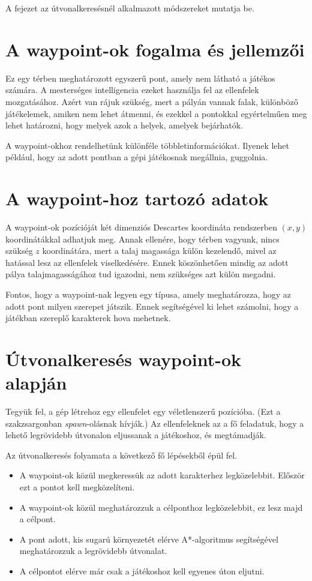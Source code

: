 \label{Chap:utvonalkereses}

A fejezet az útvonalkeresésnél alkalmazott módszereket mutatja be.

\section{A waypoint-ok fogalma és jellemzői}

Ez egy térben meghatározott egyszerű pont, amely nem látható a játékos számára. A mesterséges intelligencia ezeket használja fel az ellenfelek mozgatásához. Azért van rájuk szükség, mert a pályán vannak falak, különböző játékelemek, amiken nem lehet átmenni, és ezekkel a pontokkal egyértelműen meg lehet határozni, hogy melyek azok a helyek, amelyek bejárhatók.

A waypoint-okhoz rendelhetünk különféle többletinformációkat. Ilyenek lehet például, hogy az adott pontban a gépi játékosnak megállnia, guggolnia.

\section{A waypoint-hoz tartozó adatok}

A waypoint-ok pozícióját két dimenziós Descartes koordináta rendszerben $(x, y)$ koordinátákkal adhatjuk meg. Annak ellenére, hogy térben vagyunk, nincs szükség $z$ koordinátára, mert a talaj magassága külön kezelendő, mivel az hatással lesz az ellenfelek viselkedésére. Ennek köszönhetően mindig az adott pálya talajmagasságához tud igazodni, nem szükséges azt külön megadni.

Fontos, hogy a waypoint-nak legyen egy típusa, amely meghatározza, hogy az adott pont milyen szerepet játszik. Ennek segítségével ki lehet számolni, hogy a játékban szereplő karakterek hova mehetnek.

\section{Útvonalkeresés waypoint-ok alapján}

Tegyük fel, a gép létrehoz egy ellenfelet egy véletlenszerű pozícióba. (Ezt a szakzsargonban \textit{spawn}-olásnak hívják.) Az ellenfeleknek az a fő feladatuk, hogy a lehető legrövidebb útvonalon eljussanak a játékoshoz, és megtámadják. 

Az útvonalkeresés folyamata a következő fő lépésekből épül fel.
\begin{itemize}
\item A waypoint-ok közül megkeressük az adott karakterhez legközelebbit. Először ezt a pontot kell megközelíteni.
\item A waypoint-ok közül meghatározzuk a célponthoz legközelebbit, ez lesz majd a célpont.
\item A pont adott, kis sugarú környezetét elérve A*-algoritmus segítségével meghatározzuk a legrövidebb útvonalat.
\item A célpontot elérve már csak a játékoshoz kell egyenes úton eljutni.
\end{itemize}

